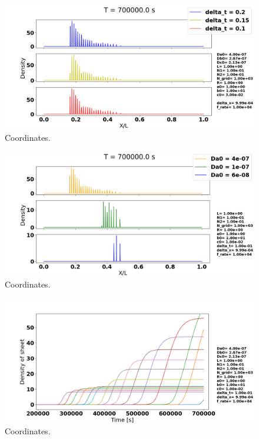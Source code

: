 \documentclass[1p]{elsarticle}        	%
\begin{document}
\begin{figure}
	\centering
	\includegraphics[width=\linewidth]{../figures/deltaT.png}
	\caption{Coordinates.}
	\label{fig:coords}
\end{figure}

\begin{figure}
	\centering
	\includegraphics[width=\linewidth]{../figures/Da0_same_ratio.png}
	\caption{Coordinates.}
	\label{fig:coords}
\end{figure}

\begin{figure}
	\centering
	\includegraphics[width=\linewidth]{../figures/peak_growth.png}
	\caption{Coordinates.}
	\label{fig:coords}
\end{figure}
\end{document}

